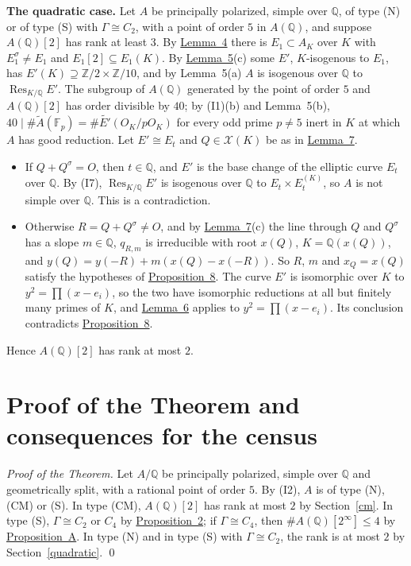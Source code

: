 \documentclass[11pt]{article}
\newcommand{\Q}{\mathbb Q}
\newcommand{\Z}{\mathbb Z}
\newcommand{\F}{\mathbb F}
\DeclareMathOperator{\Res}{Res}
\begin{document}
\medskip
\textbf{The quadratic case.} Let \(A\) be principally polarized, simple over \(\Q\), of type (N)
or of type (S) with \(\Gamma\cong C_2\), with a point of order \(5\) in \(A(\Q)\), and suppose
\(A(\Q)[2]\) has rank at least \(3\). By \hyperref[lemma-full]{Lemma~4} there is
\(E_1\subset A_K\) over \(K\) with \(E_1^\sigma\neq E_1\) and \(E_1[2]\subseteq E_1(K)\). By
\hyperref[lemma-res]{Lemma~5}(c) some \(E'\), \(K\)-isogenous to \(E_1\), has
\(E'(K)\supseteq\Z/2\times\Z/10\), and by Lemma~5(a) \(A\) is isogenous over \(\Q\) to
\(\Res_{K/\Q}E'\). The subgroup of \(A(\Q)\) generated by the point of order \(5\) and
\(A(\Q)[2]\) has order divisible by \(40\); by (I1)(b) and Lemma~5(b),
\(40\mid\#\widetilde A(\F_p)=\#\widetilde{E'}(O_K/pO_K)\) for every odd prime \(p\neq5\) inert in
\(K\) at which \(A\) has good reduction. Let \(E'\cong E_t\) and \(Q\in\mathcal X(K)\) be as in
\hyperref[lemma-x110]{Lemma~7}.
\begin{itemize}
\item If \(Q+Q^\sigma=O\), then \(t\in\Q\), and \(E'\) is the base change of the elliptic curve
\(E_t\) over \(\Q\). By (I7), \(\Res_{K/\Q}E'\) is isogenous over \(\Q\) to
\(E_t\times E_t^{(K)}\), so \(A\) is not simple over \(\Q\). This is a contradiction.
\item Otherwise \(R=Q+Q^\sigma\neq O\), and by \hyperref[lemma-x110]{Lemma~7}(c) the line through
\(Q\) and \(Q^\sigma\) has a slope \(m\in\Q\), \(q_{R,m}\) is irreducible with root \(x(Q)\),
\(K=\Q(x(Q))\), and \(y(Q)=y(-R)+m(x(Q)-x(-R))\). So \(R\), \(m\) and \(x_Q=x(Q)\) satisfy the
hypotheses of \hyperref[prop-families]{Proposition~8}. The curve \(E'\) is isomorphic over \(K\)
to \(y^2=\prod(x-e_i)\), so the two have isomorphic reductions at all but finitely many primes
of \(K\), and \hyperref[lemma-cheb]{Lemma~6} applies to \(y^2=\prod(x-e_i)\). Its conclusion
contradicts \hyperref[prop-families]{Proposition~8}.
\end{itemize}
Hence \(A(\Q)[2]\) has rank at most \(2\).

\section{Proof of the Theorem and consequences for the census}\label{census}

\emph{Proof of the Theorem.} Let \(A/\Q\) be principally polarized, simple over \(\Q\) and
geometrically split, with a rational point of order \(5\). By (I2), \(A\) is of type (N), (CM) or
(S). In type (CM), \(A(\Q)[2]\) has rank at most \(2\) by Section~\ref{cm}. In type (S),
\(\Gamma\cong C_2\) or \(C_4\) by \hyperref[prop-gamma]{Proposition~2}; if \(\Gamma\cong C_4\),
then \(\#A(\Q)[2^\infty]\le4\) by \hyperref[prop-A]{Proposition~A}. In type (N) and in type (S)
with \(\Gamma\cong C_2\), the rank is at most \(2\) by Section~\ref{quadratic}. \qed
\end{document}
